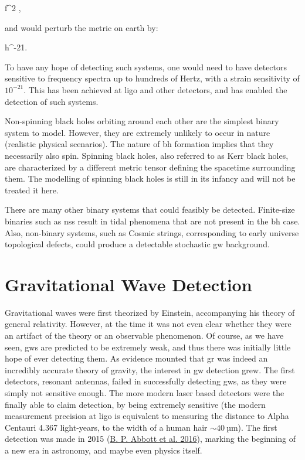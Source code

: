 \documentclass[
  11pt,
  a4paper,
  DIV=11,
  numbers=noendperiod,
  oneside]{scrreprt}
\let\[\relax \let\]\relax %
\DeclareRobustCommand{\[}{\begin{equation}}
\DeclareRobustCommand{\]}{\end{equation}}
\begin{document}
\[
f^{2}\; ,
\]

and would perturb the metric on earth by:

\[
h^{-21}.
\]

To have any hope of detecting such systems, one would need to have
detectors sensitive to frequency spectra up to hundreds of Hertz, with a
strain sensitivity of \(10^{-21}\). This has been achieved at \gls{ligo}
and other detectors, and has enabled the detection of such systems.

Non-spinning black holes orbiting around each other are the simplest
binary system to model. However, they are extremely unlikely to occur in
nature (realistic physical scenarios). The nature of \gls{bh} formation
implies that they necessarily also spin. Spinning black holes, also
referred to as Kerr black holes, are characterized by a different metric
tensor defining the spacetime surrounding them. The modelling of
spinning black holes is still in its infancy and will not be treated it
here.

There are many other binary systems that could feasibly be detected.
Finite-size binaries such as \glspl{ns} result in tidal phenomena that
are not present in the \gls{bh} case. Also, non-binary systems, such as
Cosmic strings, corresponding to early universe topological defects,
could produce a detectable stochastic \gls{gw} background.


\hypertarget{sec-gwdetect}{%
\chapter{Gravitational Wave Detection}\label{sec-gwdetect}}

Gravitational waves were first theorized by Einstein, accompanying his
theory of general relativity. However, at the time it was not even clear
whether they were an artifact of the theory or an observable phenomenon.
Of course, as we have seen, \glspl{gw} are predicted to be extremely
weak, and thus there was initially little hope of ever detecting them.
As evidence mounted that \gls{gr} was indeed an incredibly accurate
theory of gravity, the interest in \gls{gw} detection grew. The first
detectors, resonant antennas, failed in successfully detecting
\glspl{gw}, as they were simply not sensitive enough. The more modern
laser based detectors were the finally able to claim detection, by being
extremely sensitive (the modern measurement precision at \gls{ligo} is
equivalent to measuring the distance to Alpha Centauri 4.367
light-years, to the width of a human hair \(\sim 40~\mathrm{µm}\)). The
first detection was made in 2015
(\protect\hyperlink{ref-LIGOScientific:2016aoc}{B. P. Abbott et al.
2016}), marking the beginning of a new era in astronomy, and maybe even
physics itself.
\end{document}
